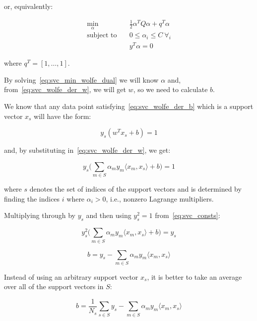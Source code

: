 or, equivalently:

\begin{equation} \label{eq:svc_min_wolfe_dual}
    \begin{aligned}
        \min_{\alpha} \quad & \frac{1}{2}\alpha^T Q\alpha+q^T\alpha \\
            \text{subject to} \quad & 0\leq\alpha_i\leq C \ \forall_i \\ & y^T\alpha=0
    \end{aligned}
\end{equation}

where $q^T = [1, \dots, 1]$.

By solving~\eqref{eq:svc_min_wolfe_dual} we will know $\alpha$ and, from~\eqref{eq:svc_wolfe_der_w}, we will get $w$, so we need to calculate $b$.

We know that any data point satisfying~\eqref{eq:svc_wolfe_der_b} which is a support vector $x_s$ will have the form:

\begin{equation} \label{eq:svc_sv_const1}
	y_s(w^T x_s + b)=1
\end{equation}

and, by substituting in~\eqref{eq:svc_wolfe_der_w}, we get:

\begin{equation} \label{eq:svc_sv_const2}
	y_s\big(\sum_{m\in S}\alpha_m y_m \langle x_m, x_s \rangle +b\big)=1
\end{equation}

where $s$ denotes the set of indices of the support vectors and is determined by finding the indices $i$ where $\alpha_i>0$, i.e., nonzero Lagrange multipliers.

Multiplying through by $y_s$ and then using $y_s^2=1$ from~\eqref{eq:svc_consts}:

\begin{equation} \label{eq:svc_sv_squared_const2}
	y_s^2\big(\sum_{m\in S}\alpha_m y_m \langle x_m, x_s \rangle +b\big)=y_s
\end{equation}

\begin{equation} \label{eq:svc_b}
	b=y_s-\sum_{m\in S}\alpha_m y_m \langle x_m, x_s \rangle
\end{equation}

Instead of using an arbitrary support vector $x_s$, it is better to take an average over all of the support vectors in $S$:

\begin{equation} \label{eq:svc_b_avg}
	b=\frac{1}{N_s}\sum_{s\in S} y_s-\sum_{m\in S}\alpha_m y_m \langle x_m, x_s \rangle
\end{equation}

